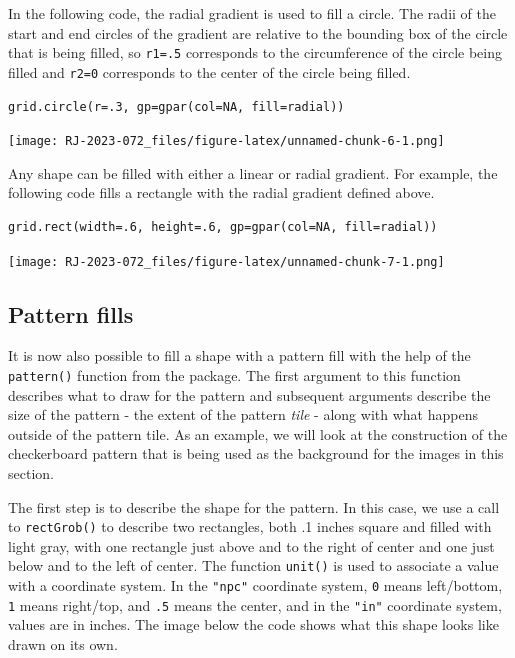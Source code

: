 In the following code, the radial gradient is used to fill a circle.
The radii of the start and end circles of the gradient
are relative to the bounding box of the circle that is being filled,
so \texttt{r1=.5} corresponds to the circumference of the circle being filled
and \texttt{r2=0} corresponds to the center of the circle being filled.

\begin{verbatim}
grid.circle(r=.3, gp=gpar(col=NA, fill=radial))
\end{verbatim}

\texttt{[image: RJ-2023-072\_files/figure-latex/unnamed-chunk-6-1.png]}

Any shape can be filled with either a linear or radial gradient.
For example, the following code fills a rectangle with the
radial gradient defined above.

\begin{verbatim}
grid.rect(width=.6, height=.6, gp=gpar(col=NA, fill=radial))
\end{verbatim}

\texttt{[image: RJ-2023-072\_files/figure-latex/unnamed-chunk-7-1.png]}

\hypertarget{pattern-fills}{%
\subsection{Pattern fills}\label{pattern-fills}}

It is now also possible to
fill a shape with a pattern fill with the help of the
\texttt{pattern()} function from the  package.
The first argument to this function describes what to draw for the
pattern and subsequent arguments describe the size of the pattern - the
extent of the pattern \emph{tile} - along with what happens outside of the
pattern tile.
As an example, we will look at the construction of the checkerboard pattern
that is being used as the background for the
images in this section.

The first step is to describe the shape for the pattern.
In this case, we use a call to \texttt{rectGrob()} to describe
two rectangles, both .1 inches square and filled with light gray,
with one rectangle just above and to the right
of center and one just below and to the left of center.
The  function \texttt{unit()} is used to associate a value with
a coordinate system. In the \texttt{"npc"} coordinate system, \texttt{0}
means left/bottom, \texttt{1} means right/top, and \texttt{.5} means the
center, and in the \texttt{"in"} coordinate system, values are in inches.
The image below the code shows what this shape looks like
drawn on its own.

